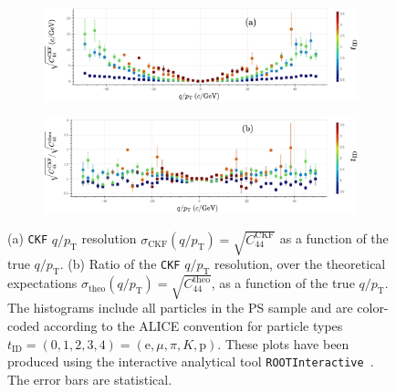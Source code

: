 \begin{figure}[!ht]
     \centering
     \begin{subfigure}[b]{0.99\textwidth}
         \centering
         \includegraphics[width=\textwidth]{figures/ch5-KF_NDGAr/ToySample/ParScan/TotVSExpVSpID_noNorm_label.eps}
         \caption{}
         \label{fig:CheckAna_pID_noNorm}
     \end{subfigure}
     \begin{subfigure}[b]{0.99\textwidth}
         \centering
         \includegraphics[width=\textwidth]{figures/ch5-KF_NDGAr/ToySample/ParScan/TotVSExpVSpID_label.eps}
         \caption{}
         \label{fig:CheckAna_pID_Norm}
     \end{subfigure}
        \caption{ (a) \texttt{CKF} $q/p_{\text{T}}$ resolution $\sigma_{\text{CKF}}(q/p_{\text{T}})=\sqrt{C_{44}^{\textrm{CKF}}}$ as a function of the true $q/p_{\text{T}}$. (b) Ratio of the \texttt{CKF} $q/p_{\text{T}}$ resolution, over the theoretical expectations $\sigma_{\text{theo}}(q/p_\text{T})=\sqrt{C_{44}^{\textrm{theo}}}$, as a function of the true $q/p_\text{T}$. The histograms include all particles in the PS sample and are color-coded according to the ALICE convention for particle types $t_\textrm{ID} = (0,1,2,3,4) = (\textrm{e},\mu,\pi,K,\textrm{p})$. These plots have been produced using the interactive analytical tool \texttt{ROOTInteractive}~\cite{RootInt}. The error bars are statistical.}
        \label{fig:Check_Ana_pID}
\end{figure}
